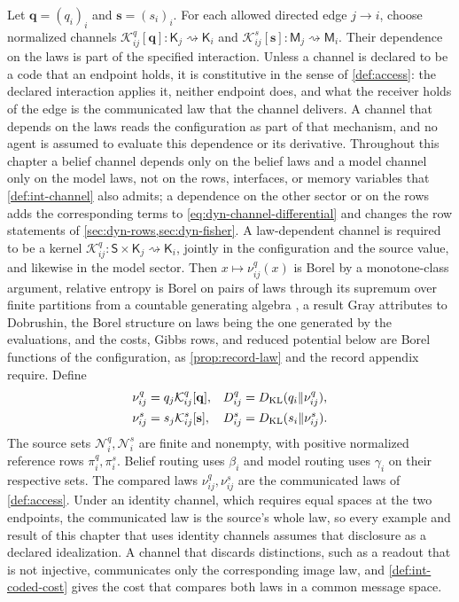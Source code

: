 Let $\mathbf q=(q_i)_i$ and $\mathbf s=(s_i)_i$. For each allowed directed edge $j\to i$, choose normalized channels $\mathcal K^q_{ij}[\mathbf q]:\mathsf K_j\rightsquigarrow\mathsf K_i$ and $\mathcal K^s_{ij}[\mathbf s]:\mathsf M_j\rightsquigarrow\mathsf M_i$. Their dependence on the laws is part of the specified interaction. Unless a channel is declared to be a code that an endpoint holds, it is constitutive in the sense of \cref{def:access}: the declared interaction applies it, neither endpoint does, and what the receiver holds of the edge is the communicated law that the channel delivers. A channel that depends on the laws reads the configuration as part of that mechanism, and no agent is assumed to evaluate this dependence or its derivative. Throughout this chapter a belief channel depends only on the belief laws and a model channel only on the model laws, not on the rows, interfaces, or memory variables that \cref{def:int-channel} also admits; a dependence on the other sector or on the rows adds the corresponding terms to \cref{eq:dyn-channel-differential} and changes the row statements of \cref{sec:dyn-rows,sec:dyn-fisher}. A law-dependent channel is required to be a kernel $\mathcal K^q_{ij}:\mathsf S\times\mathsf K_j\rightsquigarrow\mathsf K_i$, jointly in the configuration and the source value, and likewise in the model sector. Then $x\mapsto\nu^q_{ij}(x)$ is Borel by a monotone-class argument, relative entropy is Borel on pairs of laws through its supremum over finite partitions from a countable generating algebra \citep[Lemma 5.2.2]{Gray1990}, a result Gray attributes to Dobrushin, the Borel structure on laws being the one generated by the evaluations, and the costs, Gibbs rows, and reduced potential below are Borel functions of the configuration, as \cref{prop:record-law} and the record appendix require. Define
\begin{equation}
 \begin{aligned}
 \nu^q_{ij}&=q_j\mathcal K^q_{ij}[\mathbf q],&
 D^q_{ij}&=D_{\mathrm{KL}}(q_i\Vert\nu^q_{ij}),\\
 \nu^s_{ij}&=s_j\mathcal K^s_{ij}[\mathbf s],&
 D^s_{ij}&=D_{\mathrm{KL}}(s_i\Vert\nu^s_{ij}).
 \end{aligned}
 \label{eq:dyn-peer-costs}
\end{equation}
The source sets $\mathcal N_i^q,\mathcal N_i^s$ are finite and nonempty, with positive normalized reference rows $\pi_i^q,\pi_i^s$. Belief routing uses $\beta_i$ and model routing uses $\gamma_i$ on their respective sets. The compared laws $\nu^q_{ij},\nu^s_{ij}$ are the communicated laws of \cref{def:access}. Under an identity channel, which requires equal spaces at the two endpoints, the communicated law is the source's whole law, so every example and result of this chapter that uses identity channels assumes that disclosure as a declared idealization. A channel that discards distinctions, such as a readout that is not injective, communicates only the corresponding image law, and \cref{def:int-coded-cost} gives the cost that compares both laws in a common message space.

